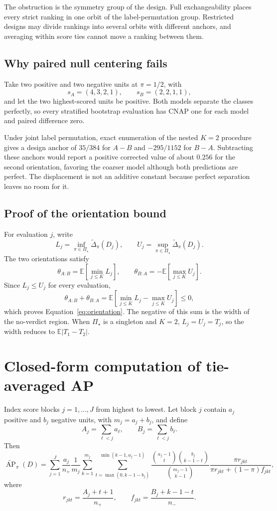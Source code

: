 \documentclass[11pt]{article}
\newcommand{\AP}{\operatorname{AP}}
\newcommand{\PSet}{\Pi_\star}
\newcommand{\E}{\mathbb{E}}
\newcommand{\APta}{\widetilde{\AP}}
\newcommand{\Dta}{\widetilde{\Delta}}
\theoremstyle{remark}
\begin{document}
The obstruction is the symmetry group of the design. Full exchangeability places every strict ranking in one orbit of the label-permutation group. Restricted designs may divide rankings into several orbits with different anchors, and averaging within score ties cannot move a ranking between them.

\subsection{Why paired null centering fails}

Take two positive and two negative units at $\pi=1/2$, with
\[
s_A=(4,3,2,1),
\qquad
s_B=(2,2,1,1),
\]
and let the two highest-scored units be positive. Both models separate the classes perfectly, so every stratified bootstrap evaluation has CNAP one for each model and paired difference zero.

Under joint label permutation, exact enumeration of the nested $K=2$ procedure gives a design anchor of $35/384$ for $A-B$ and $-295/1152$ for $B-A$. Subtracting these anchors would report a positive corrected value of about $0.256$ for the second orientation, favoring the coarser model although both predictions are perfect. The displacement is not an additive constant because perfect separation leaves no room for it.

\subsection{Proof of the orientation bound}

For evaluation $j$, write
\[
L_j=\inf_{\pi\in\PSet}\Dta_\pi(D_j),
\qquad
U_j=\sup_{\pi\in\PSet}\Dta_\pi(D_j).
\]
The two orientations satisfy
\[
\theta_{A:B}
=
\E\left[\min_{j\leq K}L_j\right],
\qquad
\theta_{B:A}
=
-\E\left[\max_{j\leq K}U_j\right].
\]
Since $L_j\leq U_j$ for every evaluation,
\[
\theta_{A:B}+\theta_{B:A}
=
\E\left[
\min_{j\leq K}L_j-\max_{j\leq K}U_j
\right]
\leq0,
\]
which proves Equation~\eqref{eq:orientation}. The negative of this sum is the width of the no-verdict region. When $\PSet$ is a singleton and $K=2$, $L_j=U_j=T_j$, so the width reduces to $\E|T_1-T_2|$.

\section{Closed-form computation of tie-averaged AP}
\label{app:tie-computation}

Index score blocks $j=1,\ldots,J$ from highest to lowest. Let block $j$ contain $a_j$ positive and $b_j$ negative units, with $m_j=a_j+b_j$, and define
\[
A_j=\sum_{\ell<j}a_\ell,
\qquad
B_j=\sum_{\ell<j}b_\ell.
\]
Then
\begin{equation}
\APta_\pi(D)
=
\sum_{j=1}^{J}
\frac{a_j}{n_+}\frac1{m_j}
\sum_{k=1}^{m_j}
\sum_{t=\max(0,k-1-b_j)}^{\min(k-1,a_j-1)}
\frac{\binom{a_j-1}{t}\binom{b_j}{k-1-t}}
{\binom{m_j-1}{k-1}}
\frac{\pi r_{jkt}}
{\pi r_{jkt}+(1-\pi)f_{jkt}},
\label{eq:tie-closed}
\end{equation}
where
\[
r_{jkt}=\frac{A_j+t+1}{n_+},
\qquad
f_{jkt}=\frac{B_j+k-1-t}{n_-}.
\]
\end{document}
